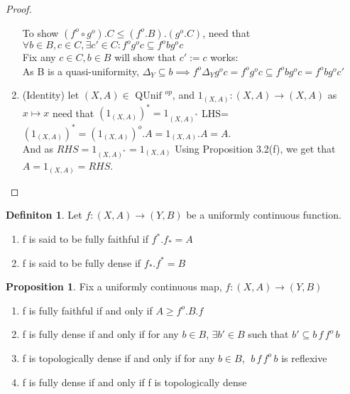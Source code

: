 \documentclass[18pt,a4paper]{article}
\theoremstyle{definition}
\newtheorem{definition}{Definiton}[section]
\newtheorem{proop}{Proposition}[section]
\begin{document}
\begin{proof}
\begin{enumerate}[label=(\roman*)]
				To show $(f^o \circ g^o).C\leq(f^o .B).(g^o .C)$, need that
				$\forall b \in B, c \in C, \exists c' \in C: f^o g^o c \subseteq f^obg^oc $
				\\Fix any $c\in C, b\in B$ will show that $c':=c$ works:\\
				As B is a quasi-uniformity, $\Delta_Y \subseteq b\implies f^o \Delta_Y
				g^o c=f^o g^o c \subseteq f^o b	g^o c=f^o b g^o c'$
			\item(Identity) let $(X,A)\in \text{ QUnif }^{op} $, and
				$1_{(X,A)}:(X,A)\to(X,A)$ as $x\mapsto x$ need that
				$(1_{(X,A)})^*=1_{(X,A)^*}$
				LHS=$(1_{(X,A)})^*=(1_{(X,A)})^o.A=1_{(X,A)}.A=A$. \\
				And as $RHS=1_{(X,A)^*}=1_{(X,A)}$
				Using Proposition 3.2(f), we get that $A=1_{(X,A)}=RHS$.
		\end{enumerate}



	\end{proof}
	\begin{definition} %
		Let $f:(X,A) \to (Y,B)$ be a uniformly continuous function.
		\begin{enumerate}[label=\Roman*]
			\item f is said to be fully faithful if	$f^* .f_*=A $
			\item f is said to be fully dense if $f_* .f^*=B $
		\end{enumerate}
	\end{definition}
	\begin{proop}
		Fix a uniformly continuous map, $f:(X,A) \rightarrow (Y,B)$
		\begin{enumerate}[label=(\alph*)]
			\item f is fully faithful if and only if $A\geq f^o.B.f$
			\item f is fully dense if and only if for any $b\in B$, $\exists b' \in B$
				such that $b' \subseteq b\,f\,f^o \,b$
			\item f is topologically dense if and only if for any $b\in B$,
				$\; b \, f\, f^o\,b$ is reflexive
			\item f is fully dense if and only if f is topologically dense
		\end{enumerate}
	\end{proop}
\end{document}
